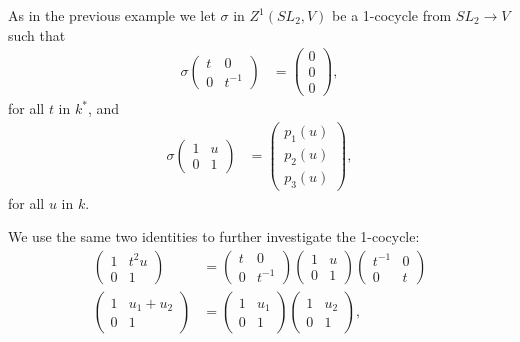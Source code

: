 As in the previous example we let $\sigma$ in $Z^1(SL_2, V)$ be a 1-cocycle from $SL_2\rightarrow V$ such that
\begin{align*}
\sigma\left( \begin{matrix} t & 0 \\ 0 & t^{-1}\end{matrix}\right) &= 
\left( \begin{matrix} 0 \\ 0 \\0\end{matrix}\right),
\end{align*}
for all $t$ in $k^*$, and
\begin{align*}
\sigma\left(\begin{matrix} 1& u \\ 0 & 1\end{matrix}\right) &=
\left(\begin{matrix} p_1(u) \\ p_2(u) \\ p_3(u) \end{matrix}\right),
\end{align*}
for all $u$ in $k$.

We use the same two identities to further investigate the 1-cocycle:
\begin{align}
\label{eq:no1}
\left(\begin{matrix} 1 & t^2u \\ 0 & 1\end{matrix}\right) &=
\left(\begin{matrix} t & 0 \\ 0 & t^{-1}  \end{matrix}\right) 
\left(\begin{matrix} 1 & u \\ 0 & 1 \end{matrix}\right) 
	\left(\begin{matrix}  t^{-1} & 0 \\ 0 & t \end{matrix}\right) \\
		\label{eq:no2}
		\left(\begin{matrix} 1 & u_1 + u_2 \\ 0 & 1 \end{matrix}\right) &=
\left(\begin{matrix} 1 & u_1 \\ 0 & 1 \end{matrix}\right) 
	\left(\begin{matrix} 1 & u_2 \\ 0 & 1 \end{matrix}\right),
	\end{align}


